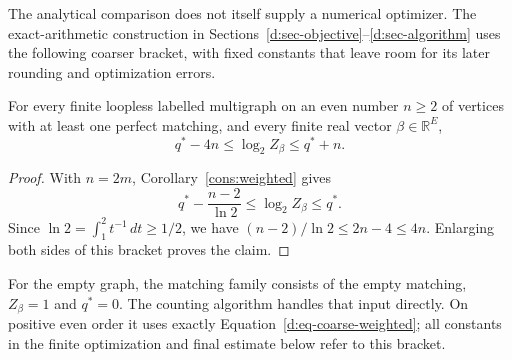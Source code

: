 The analytical comparison does not itself supply a numerical optimizer.
The exact-arithmetic construction in
Sections~\ref{d:sec-objective}--\ref{d:sec-algorithm} uses the following
coarser bracket, with fixed constants that leave room for its later
rounding and optimization errors.

\begin{corollary}
\label{d:coarse-weighted}
For every finite loopless labelled multigraph on an even number
\(n\ge2\) of vertices with at least one perfect matching, and every
finite real vector \(\beta\in\mathbb R^E\),
\begin{equation}
 \label{d:eq-coarse-weighted}
 q^*-4n\le\log_2 Z_\beta\le q^*+n.
\end{equation}
\end{corollary}

\begin{proof}
With \(n=2m\), Corollary~\ref{cons:weighted} gives
\[
 q^*-\frac{n-2}{\ln2}\le\log_2Z_\beta\le q^*.
\]
Since \(\ln2=\int_1^2t^{-1}\,dt\ge1/2\), we have
\((n-2)/\ln2\le2n-4\le4n\). Enlarging both sides of this bracket
proves the claim.
\end{proof}

For the empty graph, the matching family consists of the
empty matching, \(Z_\beta=1\) and \(q^*=0\). The counting algorithm
handles that input directly. On positive even order it uses exactly
Equation~\eqref{d:eq-coarse-weighted}; all constants in the finite
optimization and final estimate below refer to this bracket.
